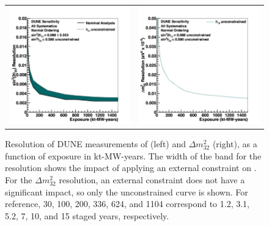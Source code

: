 \begin{figure}[h!]
    \centering
    \begin{tabular}{cc}
		\includegraphics[width=0.475\linewidth]{graphics/th23res_exp_varyconstr_nh_2019_v4.png} &
		\includegraphics[width=0.475\linewidth]{graphics/dmsqres_exp_varyconstr_nh_2019_v4.png} 
	\end{tabular}  
	\caption[Resolution of DUNE measurements of \deltacp and , as a function of exposure]{Resolution of DUNE measurements of  (left) and $\Delta m^{2}_{32}$ (right), as a function of exposure in kt-MW-years. The width of the band for the  resolution shows the impact of applying an external constraint on . For the $\Delta m^{2}_{32}$ resolution, an external constraint does not have a significant impact, so only the unconstrained curve is shown.
For reference, 30, 100, 200, 336, 624, and \SI{1104}{\ktMWyr} correspond to 1.2, 3.1, 5.2, 7, 10, and 15 staged years, respectively.
}
    \label{fig:disres_exp}
\end{figure}

